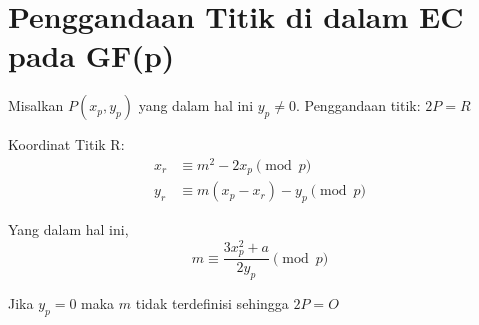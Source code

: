 \documentclass{article}
\begin{document}

\section*{Penggandaan Titik di dalam EC pada GF(p)}

Misalkan $P(x_p, y_p)$ yang dalam hal ini $y_p \neq 0$.
Penggandaan titik: $2P = R$

Koordinat Titik R:
\begin{align*}
x_r &\equiv m^2 - 2x_p \pmod{p} \\
y_r &\equiv m(x_p - x_r) - y_p \pmod{p}
\end{align*}

Yang dalam hal ini,
\[ m \equiv \frac{3x_p^2 + a}{2y_p} \pmod{p} \]

Jika $y_p = 0$ maka $m$ tidak terdefinisi sehingga $2P = O$
\end{document}
